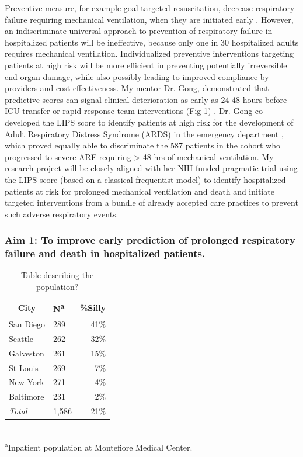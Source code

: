 \documentclass[11pt,notitlepage]{article}
\begin{document}
Preventive measure, for example goal targeted resuscitation, decrease respiratory failure requiring mechanical ventilation, when they are initiated early \cite{Rivers_12594312}. However, an indiscriminate universal approach to prevention of respiratory failure in hospitalized patients will be ineffective, because only one in 30 hospitalized adults requires mechanical ventilation. Individualized preventive interventions targeting patients at high risk will be more efficient in preventing potentially irreversible end organ damage, while also possibly leading to improved compliance by providers and cost effectiveness. My mentor Dr. Gong, demonstrated that predictive scores can signal clinical deterioration as early as 24-48 hours before ICU transfer or rapid response team interventions (Fig 1) \cite{Yu_24970344}. Dr. Gong co-developed the LIPS score to identify patients at high risk for the development of Adult Respiratory Distress Syndrome (ARDS) in the emergency department \cite{Herridge_12594312}, which proved equally able to discriminate the 587 patients in the cohort who progressed to severe ARF requiring > 48 hrs of mechanical ventilation.  My research project will be closely aligned with her NIH-funded pragmatic trial using the LIPS score (based on a classical frequentist model) to identify hospitalized patients at risk for prolonged mechanical ventilation and death and initiate targeted interventions from a bundle of already accepted care practices to prevent such adverse respiratory events.

\subsubsection*{Aim 1: To improve early prediction of prolonged respiratory failure and death in hospitalized patients.}

\begin{table} %
\caption{Table describing the population?}
\begin{center}
\begin{tabular}{l l r}
\toprule
\multicolumn{1}{c}{City} & {N\textsuperscript{a}} & {\%Silly}\\
\midrule
San Diego & 289 & 41\%\\
Seattle & 262 & 32\%\\
Galveston & 261 & 15\%\\
St Louis & 269 & 7\%\\
New York & 271 & 4\%\\
Baltimore & 231 & 2\%\\
\emph{Total} & 1,586 & 21\%\\
\hline
\end{tabular}\\
\footnotesize\textsuperscript{a}{Inpatient population at Montefiore Medical Center.}
\end{center}
\label{default}
\end{table}
\end{document}
